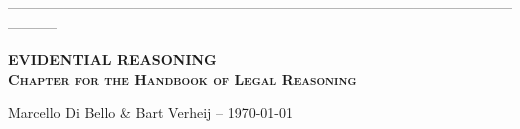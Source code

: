 \documentclass[10pt]{article}
\begin{document}
\thispagestyle{empty}

\vspace{-2cm}
\noindent
-----------------------------------------------------------------------------------------------------------------------


\vspace{5mm}
\noindent
\textsc{\large \bf EVIDENTIAL REASONING \\ Chapter for the Handbook of Legal Reasoning}

\vspace{3mm}
\noindent
Marcello Di Bello \& Bart Verheij -- \today \\
\vspace{1cm}

\vspace{1cm}



\vspace{1cm}



\tableofcontents

\newpage
\end{document}
